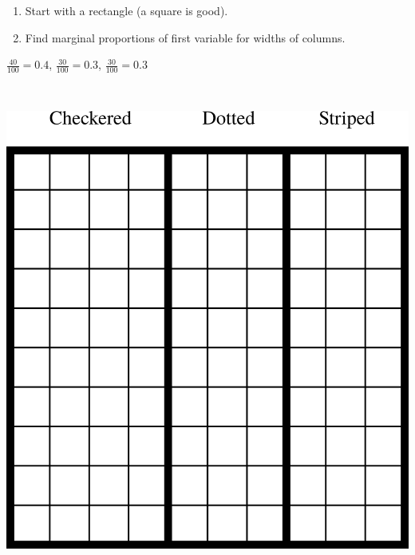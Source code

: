 \begin{frame}
\small
\begin{enumerate}
\item Start with a rectangle (a square is good).
\item Find marginal proportions of first variable for widths of columns.
\end{enumerate}
\begin{center}
$\frac{40}{100} = 0.4 $, $\frac{30}{100} = 0.3 $, $\frac{30}{100} = 0.3 $
\end{center}
\\\vfill
\begin{center}
\includegraphics[scale=0.3]{1-7_categorical_data/figures/mosaic/cols.png}
\end{center}
\end{frame}

